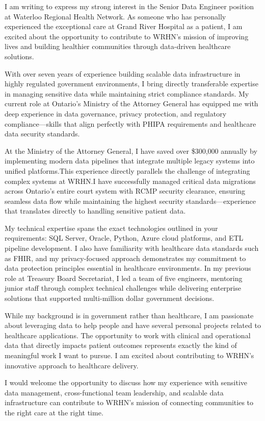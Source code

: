 \storeletterdate{\today}

\begin{storedcvletter}{
I am writing to express my strong interest in the Senior Data Engineer position at Waterloo Regional Health Network. As someone who has personally experienced the exceptional care at Grand River Hospital as a patient, I am excited about the opportunity to contribute to WRHN's mission of improving lives and building healthier communities through data-driven healthcare solutions.

With over seven years of experience building scalable data infrastructure in highly regulated government environments, I bring directly transferable expertise in managing sensitive data while maintaining strict compliance standards. My current role at Ontario's Ministry of the Attorney General has equipped me with deep experience in data governance, privacy protection, and regulatory compliance—skills that align perfectly with PHIPA requirements and healthcare data security standards.

At the Ministry of the Attorney General, I have saved over \$300,000 annually by implementing modern data pipelines that integrate multiple legacy systems into unified platforms.\@ This experience directly parallels the challenge of integrating complex systems at WRHN.\@ I have successfully managed critical data migrations across Ontario's entire court system with RCMP security clearance, ensuring seamless data flow while maintaining the highest security standards—experience that translates directly to handling sensitive patient data.

My technical expertise spans the exact technologies outlined in your requirements: SQL Server, Oracle, Python, Azure cloud platforms, and ETL pipeline development. I also have familiarity with healthcare data standards such as FHIR, and my privacy-focused approach demonstrates my commitment to data protection principles essential in healthcare environments. In my previous role at Treasury Board Secretariat, I led a team of five engineers, mentoring junior staff through complex technical challenges while delivering enterprise solutions that supported multi-million dollar government decisions.

While my background is in government rather than healthcare, I am passionate about leveraging data to help people and have several personal projects related to healthcare applications. The opportunity to work with clinical and operational data that directly impacts patient outcomes represents exactly the kind of meaningful work I want to pursue. I am excited about contributing to WRHN's innovative approach to healthcare delivery.

I would welcome the opportunity to discuss how my experience with sensitive data management, cross-functional team leadership, and scalable data infrastructure can contribute to WRHN's mission of connecting communities to the right care at the right time.
}
\end{storedcvletter}

